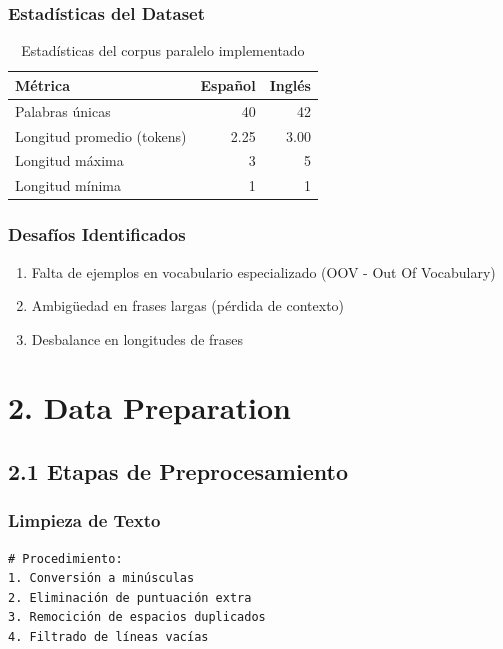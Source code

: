 \documentclass[12pt,a4paper]{article}
\begin{document}
\subsubsection{Estadísticas del Dataset}
\begin{table}[H]
    \centering
    \begin{tabular}{lrr}
        \toprule
        \textbf{Métrica} & \textbf{Español} & \textbf{Inglés} \\
        \midrule
        Palabras únicas & 40 & 42 \\
        Longitud promedio (tokens) & 2.25 & 3.00 \\
        Longitud máxima & 3 & 5 \\
        Longitud mínima & 1 & 1 \\
        \bottomrule
    \end{tabular}
    \caption{Estadísticas del corpus paralelo implementado}
\end{table}

\subsubsection{Desafíos Identificados}
\begin{enumerate}
    \item Falta de ejemplos en vocabulario especializado (OOV - Out Of Vocabulary)
    \item Ambigüedad en frases largas (pérdida de contexto)
    \item Desbalance en longitudes de frases
\end{enumerate}

\section{2. Data Preparation}

\subsection{2.1 Etapas de Preprocesamiento}

\subsubsection{Limpieza de Texto}
\begin{lstlisting}
# Procedimiento:
1. Conversión a minúsculas
2. Eliminación de puntuación extra
3. Remocición de espacios duplicados
4. Filtrado de líneas vacías
\end{lstlisting}
\end{document}
